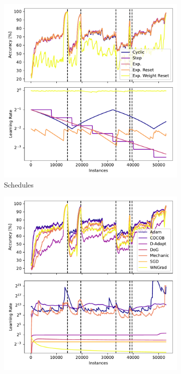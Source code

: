 \documentclass[runningheads]{llncs}
\begin{document}
\begin{figure}[ht]
	\centering
	\begin{subfigure}[b]{0.47\textwidth}
		\includegraphics[width=\textwidth]{figures/lr_norms_schedules_insects_abrupt.pdf}
		\caption{Schedules}
		\label{fig:prequential_schedulers_insects}
	\end{subfigure}
	\begin{subfigure}[b]{0.47\textwidth}
		\includegraphics[width=\textwidth]{figures/lr_norms_optims_insects_abrupt.pdf}

\end{subfigure}
\end{figure}
\end{document}
